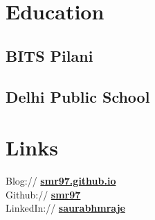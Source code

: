 \documentclass[]{smresume}
\begin{document}
%
%
\lastupdated

%
%

%
%

\begin{minipage}[t]{0.33\textwidth} 


\section{Education} 

\subsection{BITS Pilani}
\subsectionsep

\subsection{Delhi Public School}
\sectionsep


\section{Links} 
Blog:// \href{https://smr97.github.io/categories/}{\bf smr97.github.io} \\
Github:// \href{https://github.com/smr97}{\bf smr97} \\
LinkedIn://  \href{https://www.linkedin.com/in/saurabhmraje/}{\bf saurabhmraje} \\
\sectionsep


\end{minipage}
\end{document}
